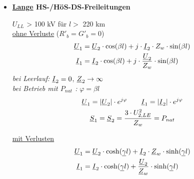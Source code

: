 \begin{itemize}
\item[] \textbf{\ul{Lange} HS-/HöS-DS-Freileitungen}

    $U_{LL}$ > 100 kV für $l>$ 220 km\\

    \ul{ohne Verluste} ($R'_b = G'_b = 0$)
    \begin{align*}
        \underline{U}_1 &= \underline{U}_2 \cdot \cos(\beta l) + j \cdot \underline{I}_2 \cdot Z_w \cdot \sin (\beta l)\\
        \underline{I}_1 &= \underline{I}_2 \cdot \cos(\beta l) + j \cdot \frac{\underline{U}_2}{Z_w} \cdot \sin (\beta l)
    \end{align*}
    \textit{bei Leerlauf:} $\underline{I}_2 = 0$, $\underline{Z}_2 \rightarrow \infty$\\
    \textit{bei Betrieb mit $P_{nat}$ :} $\varphi = \beta l$
    \begin{gather*}
        \underline{U}_1 = |\underline{U}_2| \cdot e^{j\varphi} \qquad
        \underline{I}_1 = |\underline{I}_2| \cdot e^{j\varphi}\\
        \underline{S}_1 = \underline{S}_2 = \frac{3 \cdot U_{2,LE}^2}{Z_w} = P_{nat}
    \end{gather*}

    \ul{mit Verlusten}
    \begin{align*}
        \underline{U}_1 &= \underline{U}_2 \cdot \cosh(\underline{\gamma} l) + \underline{I}_2 \cdot \underline{Z}_w \cdot \sinh(\underline{\gamma} l)\\
        \underline{I}_1 &= \underline{I}_2 \cdot \cosh(\underline{\gamma} l) + \frac{\underline{U}_2}{\underline{Z}_w}\cdot \sinh(\underline{\gamma} l)\\
    \end{align*}
\end{itemize}
